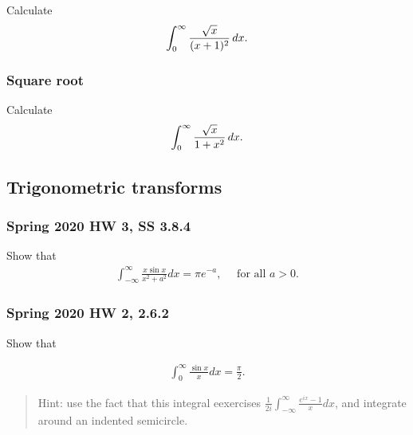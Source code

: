 \begin{problem}[?]

Calculate
\begin{align*}
\int_0^\infty {\sqrt x \over (x+1)^2} \,dx
.\end{align*}

\end{problem}

\hypertarget{square-root}{%
\subsubsection{Square root}\label{square-root}}

\begin{problem}[?]

Calculate
\begin{align*}
\int_0^\infty {\sqrt x \over 1 + x^2} \, dx
.\end{align*}

\end{problem}

\hypertarget{trigonometric-transforms}{%
\subsection{Trigonometric transforms}\label{trigonometric-transforms}}

\hypertarget{spring-2020-hw-3-ss-3.8.4}{%
\subsubsection{Spring 2020 HW 3, SS
3.8.4}\label{spring-2020-hw-3-ss-3.8.4}}

Show that
\begin{align*}
\int_{-\infty}^{\infty} \frac{x \sin x}{x^{2}+a^{2}} d x=\pi e^{-a}, \quad \text { for all } a>0
.\end{align*}

\hypertarget{spring-2020-hw-2-2.6.2}{%
\subsubsection{Spring 2020 HW 2, 2.6.2}\label{spring-2020-hw-2-2.6.2}}

Show that

\begin{align*}
\int_{0}^{\infty} \frac{\sin x}{x} d x=\frac{\pi}{2}
.\end{align*}

\begin{quote}
Hint: use the fact that this integral eexercises
\(\frac{1}{2 i} \int_{-\infty}^{\infty} \frac{e^{i x}-1}{x} d x\), and
integrate around an indented semicircle.
\end{quote}

